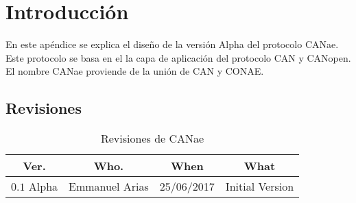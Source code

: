 \section{Introducción}
En este apéndice se explica el diseño de la versión Alpha del protocolo CANae. Este protocolo se basa en el la capa de aplicación del protocolo CAN y CANopen. El nombre CANae proviende de la unión de CAN y CONAE. 

\subsection{Revisiones}
\begin{table}[H]
  \centering
  \caption{Revisiones de CANae}
  \label{table:revisiones_canae}
  \begin{tabular}{|p{1cm}|p{2cm}|p{2cm}|p{5cm}|}
  \hline
  \multicolumn{1}{|c|}{\textbf{Ver.}} & \multicolumn{1}{c|}{\textbf{Who.}} & \multicolumn{1}{c|}{\textbf{When}} & \multicolumn{1}{c|}{\textbf{What}} \\ \hline \hline
 $0.1$ Alpha & Emmanuel Arias & 25/06/2017 & Initial Version \\ \hline
  \end{tabular}
\end{table}
\newpage

